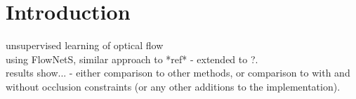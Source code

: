 

\section{Introduction}
unsupervised learning of optical flow\\
using FlowNetS, similar approach to *ref* - extended to ?.\\
results show... - either comparison to other methods, or comparison to with and without occlusion constraints (or any other additions to the implementation).\\

